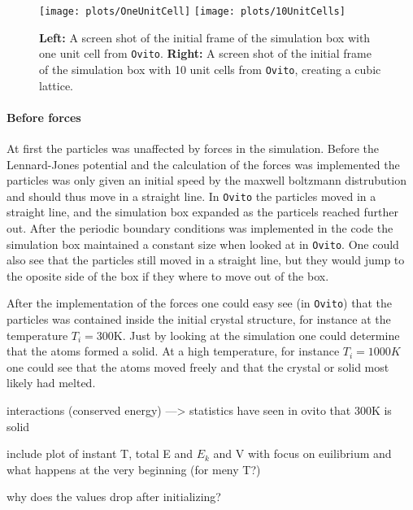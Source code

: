 \documentclass[11pt,a4wide]{article}
\begin{document}
\begin{figure}[htp]
\centering
\texttt{[image: plots/OneUnitCell]}
\texttt{[image: plots/10UnitCells]}
\caption{\textbf{Left:} A screen shot of the initial frame of the simulation box with one unit cell from \texttt{Ovito}. \textbf{Right:} A screen shot of the initial frame of the simulation box with 10 unit cells from \texttt{Ovito}, creating a cubic lattice.}
\label{fig: unitCellsOvito}
\end{figure}

\paragraph{Before forces}
At first the particles was unaffected by forces in the simulation. Before the Lennard-Jones potential and the calculation of the forces was implemented the particles was only given an initial speed by the maxwell boltzmann distrubution and should thus move in a straight line. In \texttt{Ovito} the particles moved in a straight line, and the simulation box expanded as the particels reached further out. After the periodic boundary conditions was implemented in the code the simulation box maintained a constant size when looked at in \texttt{Ovito}. One could also see that the particles still moved in a straight line, but they would jump to the oposite side of the box if they where to move out of the box. 

After the implementation of the forces one could easy see (in \texttt{Ovito}) that the particles was contained inside the initial crystal structure, for instance at the temperature $T_i =300$K. Just by looking at the simulation one could determine that the atoms formed a solid. At a high temperature, for instance $T_i = 1000K$ one could see that the atoms moved freely and that the crystal or solid most likely had melted. 




interactions (conserved energy) ---> statistics
have seen in ovito that 300K is solid


include plot of instant T, total E and $E_k$ and V with focus on euilibrium and what happens at the very beginning (for meny T?)

why does the values drop after initializing?
\end{document}
